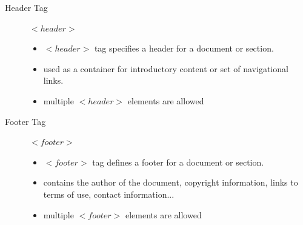 \documentclass[11pt,a4paper]{article}
\begin{document}
\begin{description}
\item[Header Tag] $<header>$
\begin{itemize}
\item $< header >$ tag specifies a header for a document or section.
\item used as a container for introductory content or set of navigational links.
\item multiple $< header >$ elements are allowed\\
\end{itemize}

\item[Footer Tag] $<footer>$ 
\begin{itemize}
\item $<footer>$ tag defines a footer for a document or section.
\item contains the author of the document, copyright information, links to terms of use, contact information...
\item multiple $<footer>$ elements are allowed
\end{itemize}
\end{description}
\end{document}
